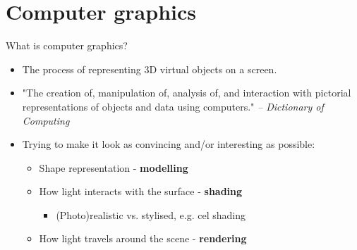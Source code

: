 \part{Computer graphics}
\frame{\partpage}

\begin{frame}{What is computer graphics?}
	\begin{itemize}
		\pause\item The process of representing 3D virtual objects on a screen.
		\pause\item "The creation of, manipulation of, analysis of, and interaction with pictorial representations of objects and data using computers." \textit{-- Dictionary of Computing}
		\pause\item Trying to make it look as convincing and/or interesting as possible:
		\begin{itemize}
			\pause\item Shape representation - \textbf{modelling}
			\pause\item How light interacts with the surface - \textbf{shading}
			\begin{itemize}
				\pause\item (Photo)realistic vs. stylised, e.g. cel shading
			\end{itemize}
			\pause\item How light travels around the scene - \textbf{rendering}
		\end{itemize}
	\end{itemize}
\end{frame}

